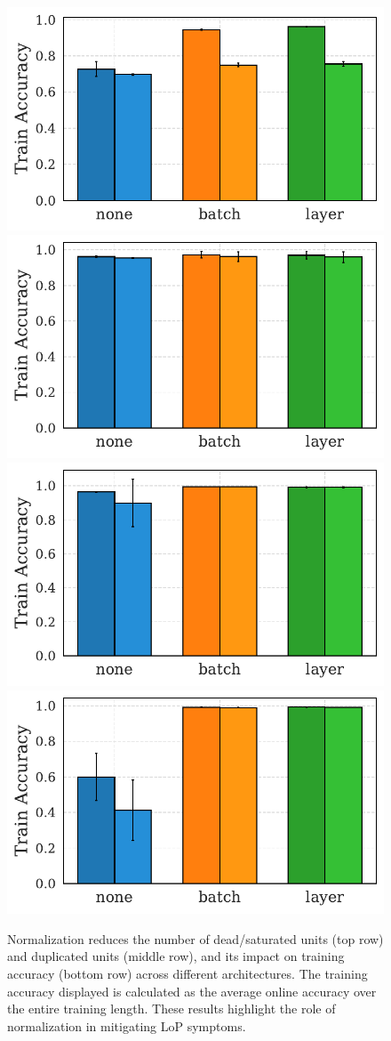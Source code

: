 \documentclass{article}
\numberwithin{figure}{section}
\begin{document}
\begin{figure}[!ht]
    \includegraphics[width=0.2\linewidth]{paper/images/act__train_acc_p_normalizations_barplot.pdf}
    \includegraphics[width=0.2\linewidth]{paper/images/cnn_act__train_acc_p_normalizations_barplot.pdf}
    \includegraphics[width=0.2\linewidth]{paper/images/resnet_block_train_acc_p_normalizations_barplot.pdf}
    \includegraphics[width=0.2\linewidth]{paper/images/vit_block_train_acc_p_normalizations_barplot.pdf}
    \caption{Normalization reduces the number of dead/saturated units (top row) and duplicated units (middle row), and its impact on training accuracy (bottom row) across different architectures. The training accuracy displayed is calculated as the average online accuracy over the entire training length. These results highlight the role of normalization in mitigating LoP symptoms.}
    \label{fig:normalizations-recovering}
\end{figure}
\end{document}
